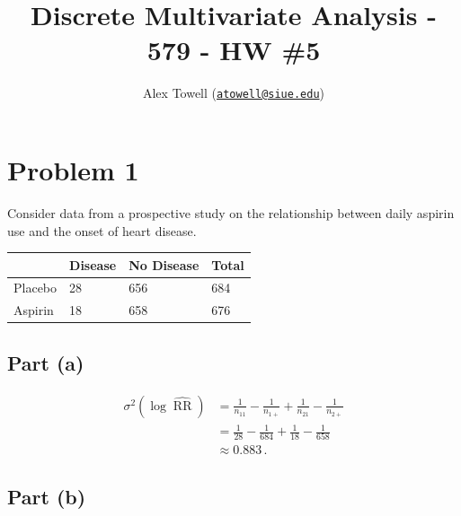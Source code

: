 \documentclass[
]{article}
\title{Discrete Multivariate Analysis - 579 - HW \#5}
\author{Alex Towell
(\href{mailto:atowell@siue.edu}{\nolinkurl{atowell@siue.edu}})}
\date{}
\begin{document}
\maketitle

\newcommand{\var}{\operatorname{Var}}
\newcommand{\expect}{\operatorname{E}}
\newcommand{\corr}{\operatorname{Corr}}
\newcommand{\cov}{\operatorname{Cov}}
\newcommand{\ssr}{\operatorname{SSR}}
\newcommand{\se}{\operatorname{SE}}
\newcommand{\mat}[1]{\mathbf{#1}}
\newcommand{\RR}{\operatorname{RR}}
\newcommand{\eval}[2]{\left. #1 \right\vert_{#2}}

\hypertarget{problem-1}{%
\section{Problem 1}\label{problem-1}}

Consider data from a prospective study on the relationship between daily
aspirin use and the onset of heart disease.

\begin{longtable}[]{@{}llll@{}}
\toprule\noalign{}
& Disease & No Disease & Total \\
\midrule\noalign{}
\endhead
\bottomrule\noalign{}
\endlastfoot
Placebo & 28 & 656 & 684 \\
Aspirin & 18 & 658 & 676 \\
\end{longtable}

\hypertarget{part-a}{%
\subsection{Part (a)}\label{part-a}}


\begin{align*}
  \sigma^2\!\left(\log \hat{\operatorname{RR}}\right)
    &= \frac{1}{n_{1 1}} - \frac{1}{n_{1+}} + \frac{1}{n_{2 1}} - \frac{1}{n_{2+}}\\
    &= \frac{1}{28} - \frac{1}{684} + \frac{1}{18} - \frac{1}{658}\\
    &\approx 0.883\,.
\end{align*}

\hypertarget{part-b}{%
\subsection{Part (b)}\label{part-b}}

\end{document}
